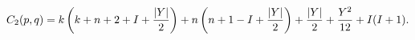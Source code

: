 \begin{equation}
C_2(p,q)=k\left(k+n+2+I+{|Y|\over 2}\right) 
+n\left(n+1-I+{|Y|\over 2}\right)+{|Y|\over 2}+{Y^2\over 12}
+I(I+1).
\end{equation}

